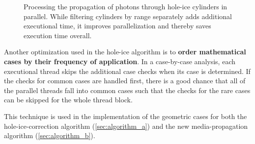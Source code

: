 
\begin{figure}[htbp]
  \hfill
  \caption{Processing the propagation of photons through hole-ice cylinders in parallel. While filtering cylinders by range separately adds additional executional time, it improves parallelization and thereby saves execution time overall.}
  \label{fig:ceiV8Yai}
\end{figure}


Another optimization used in the hole-ice algorithm is to \textbf{order mathematical cases by their frequency of application}. In a case-by-case analysis, each executional thread skips the additional case checks when its case is determined. If the checks for common cases are handled first, there is a good chance that all of the parallel threads fall into common cases such that the checks for the rare cases can be skipped for the whole thread block.

This technique is used in the implementation of the geometric cases for both the hole-ice-correction algorithm (\ref{sec:algorithm_a}) and the new media-propagation algorithm (\ref{sec:algorithm_b}).


